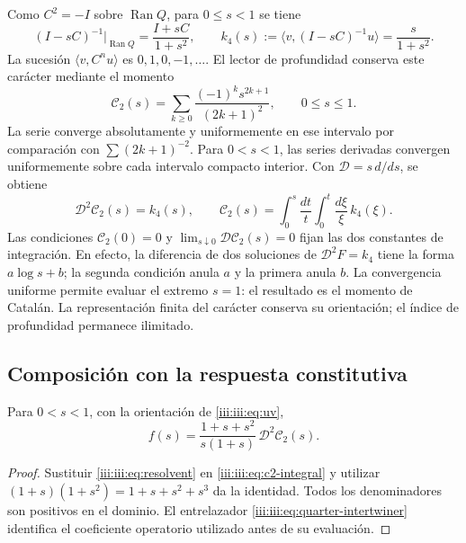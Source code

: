 Como $C^2=-I$ sobre $\operatorname{Ran}Q$, para $0\leq s<1$ se tiene
\begin{equation}
 (I-sC)^{-1}\big|_{\operatorname{Ran}Q}=\frac{I+sC}{1+s^2},
 \qquad k_4(s):=\langle v,(I-sC)^{-1}u\rangle=\frac{s}{1+s^2}.
 \label{iii:iii:eq:resolvent}
\end{equation}
La sucesión $\langle v,C^nu\rangle$ es $0,1,0,-1,\ldots$. El lector
de profundidad conserva este carácter mediante el momento
\begin{equation}
 \mathcal C_2(s)=\sum_{k\geq0}\frac{(-1)^ks^{2k+1}}{(2k+1)^2},
 \qquad 0\leq s\leq1.
 \label{iii:iii:eq:c2}
\end{equation}
La serie converge absolutamente y uniformemente en ese intervalo por
comparación con $\sum(2k+1)^{-2}$. Para $0<s<1$, las series derivadas
convergen uniformemente sobre cada intervalo compacto interior. Con
$\mathcal D=s\,d/ds$, se obtiene
\begin{equation}
 \mathcal D^2\mathcal C_2(s)=k_4(s),\qquad
 \mathcal C_2(s)=\int_0^s\frac{dt}{t}\int_0^t\frac{d\xi}{\xi}\,k_4(\xi).
 \label{iii:iii:eq:c2-integral}
\end{equation}
Las condiciones $\mathcal C_2(0)=0$ y
$\lim_{s\downarrow0}\mathcal D\mathcal C_2(s)=0$ fijan las dos constantes
de integración. En efecto, la diferencia de dos soluciones de
$\mathcal D^2F=k_4$ tiene la forma $a\log s+b$; la segunda condición
anula $a$ y la primera anula $b$.
La convergencia uniforme permite evaluar el extremo $s=1$: el resultado es
el momento de Catalán. La representación finita del carácter conserva su
orientación; el índice de profundidad permanece ilimitado.

\subsection{Composición con la respuesta constitutiva}

\begin{theorem}
Para $0<s<1$, con la orientación de \eqref{iii:iii:eq:uv},
\begin{equation}
 f(s)=\frac{1+s+s^2}{s(1+s)}\,\mathcal D^2\mathcal C_2(s).
 \label{iii:iii:eq:catalan-vacuum}
\end{equation}
\end{theorem}
\begin{proof}
Sustituir \eqref{iii:iii:eq:resolvent} en \eqref{iii:iii:eq:c2-integral} y utilizar
$(1+s)(1+s^2)=1+s+s^2+s^3$ da la identidad. Todos los denominadores son
positivos en el dominio. El entrelazador \eqref{iii:iii:eq:quarter-intertwiner}
identifica el coeficiente operatorio utilizado antes de su evaluación.
\end{proof}

